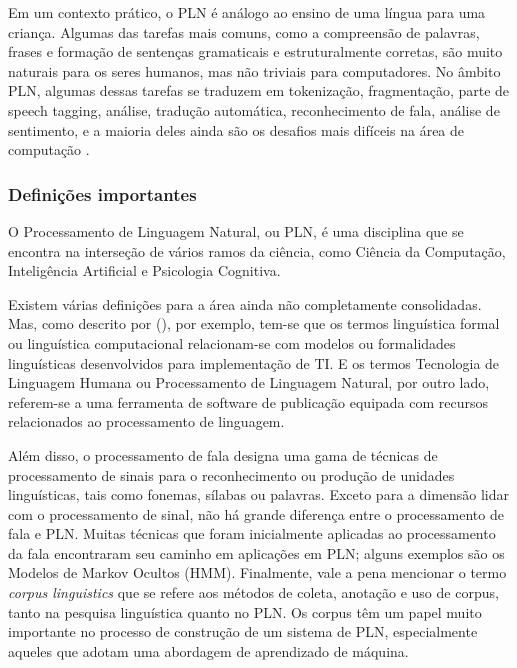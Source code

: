 \documentclass[
	12pt,				%
	openright,			%
	oneside,			%
	a4paper,			%
	english,			%
	spanish,			%
	brazil				%
	]{abntex2}
\begin{document}
	Em um contexto prático, o PLN é análogo ao ensino de uma língua para uma criança. Algumas das tarefas mais comuns, como a compreensão de palavras, frases e formação de sentenças gramaticais e estruturalmente corretas, são muito naturais para os seres humanos, mas não triviais para computadores. No âmbito PLN, algumas dessas tarefas se traduzem em tokenização, fragmentação, parte de speech tagging, análise, tradução automática, reconhecimento de fala, análise de sentimento, e a maioria deles ainda são os desafios mais difíceis na área de computação \cite{book_natlang_python}.
		
	\subsubsection*{Definições importantes}
	O Processamento de Linguagem Natural, ou PLN, é uma disciplina que se encontra na interseção de vários ramos da ciência, como Ciência da Computação, Inteligência Artificial e Psicologia Cognitiva. 
	
Existem várias definições para a área ainda não completamente consolidadas. Mas, como descrito por   (\citeyear{book_natural_lang}), por exemplo, tem-se que os termos linguística formal ou linguística computacional relacionam-se com modelos ou formalidades linguísticas desenvolvidos para implementação de TI. E os termos Tecnologia de Linguagem Humana ou Processamento de Linguagem Natural, por outro lado, referem-se a uma ferramenta de software de publicação equipada com recursos relacionados ao processamento de linguagem. 

Além disso, o processamento de fala designa uma gama de técnicas de processamento de sinais para o reconhecimento ou produção de unidades linguísticas, tais como fonemas, sílabas ou palavras. Exceto para a dimensão lidar com o processamento de sinal, não há grande diferença entre o processamento de fala e PLN. Muitas técnicas que foram inicialmente aplicadas ao processamento da fala encontraram seu caminho em aplicações em PLN; alguns exemplos são os Modelos de Markov Ocultos (HMM). Finalmente, vale a pena mencionar o termo \textit{corpus linguistics}  que se refere aos métodos de coleta, anotação e uso de corpus, tanto na pesquisa linguística quanto no PLN. Os corpus têm um papel muito importante no processo de construção de um sistema de PLN, especialmente aqueles que adotam uma abordagem de aprendizado de máquina.
\end{document}
